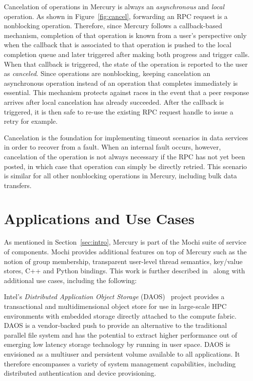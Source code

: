 \documentclass[11pt]{article}
\begin{document}
Cancelation of operations in Mercury is always an \textit{asynchronous} and
\textit{local} operation. As shown in Figure~\ref{fig:cancel}, forwarding an RPC
request is a nonblocking operation. Therefore, since Mercury follows a callback-based
mechanism, completion of that operation is known from a user's
perspective only when the callback that is associated to that operation
is pushed to the local completion queue and later triggered after making both
progress and trigger calls. When that callback is triggered, the state of the
operation is reported to the user as \textit{canceled}. Since operations are nonblocking,
keeping cancelation an asynchronous operation instead of an operation that completes
immediately is essential.
This mechanism protects against races in the event that a peer response arrives
after local cancelation has already succeeded. After the callback is triggered,
it is then safe to re-use the existing RPC request handle to issue a retry for example.

Cancelation is the foundation for implementing timeout scenarios in data services
in order to recover from a fault. When an internal
fault occurs, however, cancelation of the operation is not always necessary if the RPC
has not yet been posted, in which case that operation can simply be directly retried. This
scenario is similar for all other nonblocking operations in Mercury, including
bulk data transfers.

\section{Applications and Use Cases}
\label{sec:apps}

As mentioned in Section~\ref{sec:intro}, Mercury is part of the Mochi suite of service of components.
Mochi provides additional features on top of Mercury such as the notion of group membership,
transparent user-level thread semantics, key/value stores, C++ and Python bindings.
This work is further described in~\cite{Ross2020} along with
additional use cases, including the following:

Intel's \textit{Distributed Application Object Storage} (DAOS)~\cite{Intel2019} project
provides a transactional and multidimensional object store for
use in large-scale HPC environments with embedded storage directly
attached to the compute fabric. DAOS is a vendor-backed push to
provide an alternative to the traditional parallel file system and has the
potential to extract higher performance out of emerging low latency storage
technology by running in user space. DAOS is envisioned as a multiuser and persistent
volume available to all applications. It therefore encompasses a variety of
system management capabilities, including distributed authentication and
device provisioning.
\end{document}
